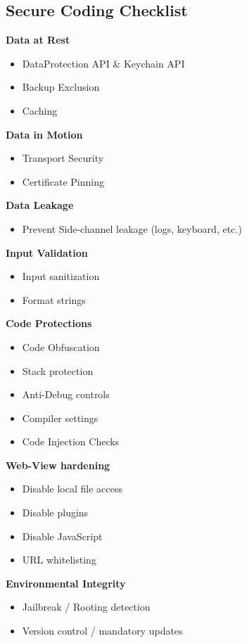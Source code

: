 \subsection{Secure Coding Checklist}
\textbf{Data at Rest}
\begin{itemize}
    \item DataProtection API \& Keychain API
    \item Backup Exclusion
    \item Caching
\end{itemize}
\textbf{Data in Motion}
\begin{itemize}
    \item Transport Security
    \item Certificate Pinning
\end{itemize}
\textbf{Data Leakage}
\begin{itemize}
    \item Prevent Side-channel leakage (logs, keyboard, etc.)
\end{itemize}
\textbf{Input Validation}
\begin{itemize}
    \item Input sanitization
    \item Format strings
\end{itemize}
\textbf{Code Protections}
\begin{itemize}
    \item Code Obfuscation
    \item Stack protection
    \item Anti-Debug controls
    \item Compiler settings
    \item Code Injection Checks
\end{itemize}
\textbf{Web-View hardening}
\begin{itemize}
    \item Disable local file access
    \item Disable plugins
    \item Disable JavaScript
    \item URL whitelisting
\end{itemize}
\textbf{Environmental Integrity}
\begin{itemize}
    \item Jailbreak / Rooting detection
    \item Version control / mandatory updates
\end{itemize}